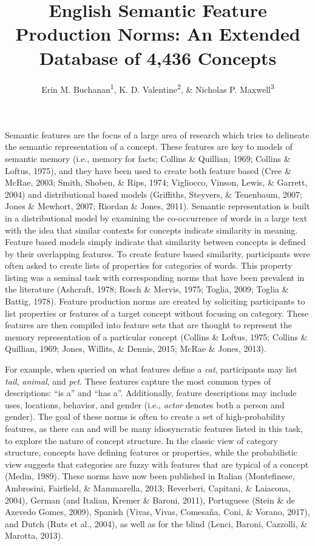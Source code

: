 \documentclass[english,,man]{apa6}
\title{English Semantic Feature Production Norms: An Extended Database of 4,436 Concepts}
\author{Erin M. Buchanan\textsuperscript{1}, K. D. Valentine\textsuperscript{2}, \& Nicholas P. Maxwell\textsuperscript{3}}
\date{}
\affiliation{
\vspace{0.5cm}
\textsuperscript{1} Harrisburg University of Science and Technology\\\textsuperscript{2} University of Missouri\\\textsuperscript{3} University of Southern Mississippi}
\begin{document}
\maketitle

Semantic features are the focus of a large area of research which tries to delineate the semantic representation of a concept. These features are key to models of semantic memory (i.e., memory for facts; Collins \& Quillian, 1969; Collins \& Loftus, 1975), and they have been used to create both feature based (Cree \& McRae, 2003; Smith, Shoben, \& Rips, 1974; Vigliocco, Vinson, Lewis, \& Garrett, 2004) and distributional based models (Griffiths, Steyvers, \& Tenenbaum, 2007; Jones \& Mewhort, 2007; Riordan \& Jones, 2011). Semantic representation is built in a distributional model by examining the co-occurrence of words in a large text with the idea that similar contexts for concepts indicate similarity in meaning. Feature based models simply indicate that similarity between concepts is defined by their overlapping features. To create feature based similarity, participants were often asked to create lists of properties for categories of words. This property listing was a seminal task with corresponding norms that have been prevalent in the literature (Ashcraft, 1978; Rosch \& Mervis, 1975; Toglia, 2009; Toglia \& Battig, 1978). Feature production norms are created by soliciting participants to list properties or features of a target concept without focusing on category. These features are then compiled into feature sets that are thought to represent the memory representation of a particular concept (Collins \& Loftus, 1975; Collins \& Quillian, 1969; Jones, Willits, \& Dennis, 2015; McRae \& Jones, 2013).

For example, when queried on what features define a \emph{cat}, participants may list \emph{tail}, \emph{animal}, and \emph{pet}. These features capture the most common types of descriptions: \enquote{is a} and \enquote{has a}. Additionally, feature descriptions may include uses, locations, behavior, and gender (i.e., \emph{actor} denotes both a person and gender). The goal of these norms is often to create a set of high-probability features, as there can and will be many idiosyncratic features listed in this task, to explore the nature of concept structure. In the classic view of category structure, concepts have defining features or properties, while the probabilistic view suggests that categories are fuzzy with features that are typical of a concept (Medin, 1989). These norms have now been published in Italian (Montefinese, Ambrosini, Fairfield, \& Mammarella, 2013; Reverberi, Capitani, \& Laiacona, 2004), German (and Italian, Kremer \& Baroni, 2011), Portuguese (Stein \& de Azevedo Gomes, 2009), Spanish (Vivas, Vivas, Comesaña, Coni, \& Vorano, 2017), and Dutch (Ruts et al., 2004), as well as for the blind (Lenci, Baroni, Cazzolli, \& Marotta, 2013).
\end{document}
